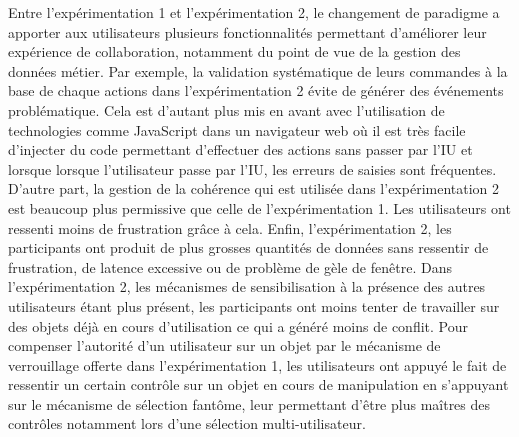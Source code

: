 Entre l'expérimentation 1 et l'expérimentation 2, le changement de paradigme a 
apporter aux utilisateurs plusieurs fonctionnalités permettant d'améliorer leur 
expérience de collaboration, notamment du point de vue de la gestion des 
données métier. Par exemple, la validation systématique de leurs commandes à la 
base de chaque actions dans l'expérimentation 2 évite de générer des événements 
problématique. Cela est d'autant plus mis en avant avec l'utilisation de 
technologies comme JavaScript dans un navigateur web où il est très facile 
d'injecter du code permettant d'effectuer des actions sans passer par l'\gls{IU} et 
lorsque lorsque l'utilisateur passe par l'\gls{IU}, les erreurs de saisies sont 
fréquentes. D'autre part, la gestion de la cohérence qui est utilisée dans 
l'expérimentation 2 est beaucoup plus permissive que celle de l'expérimentation 1. 
Les utilisateurs ont ressenti moins de frustration grâce à cela. Enfin, 
l'expérimentation 2, les participants ont produit de plus grosses quantités de 
données sans ressentir de frustration, de latence excessive ou de problème de 
gèle de fenêtre.
Dans l'expérimentation 2, les mécanismes de sensibilisation à la présence des 
autres utilisateurs étant plus présent, les participants ont moins tenter de travailler 
sur des objets déjà en cours d'utilisation ce qui a généré moins de conflit. 
Pour compenser l'autorité d'un utilisateur sur un objet par le mécanisme de 
verrouillage offerte dans l'expérimentation 1, les utilisateurs ont appuyé le fait de 
ressentir un certain contrôle sur un objet en cours de manipulation en s'appuyant 
sur le mécanisme de sélection fantôme, leur permettant d'être plus maîtres des 
contrôles notamment lors d'une sélection multi-utilisateur.